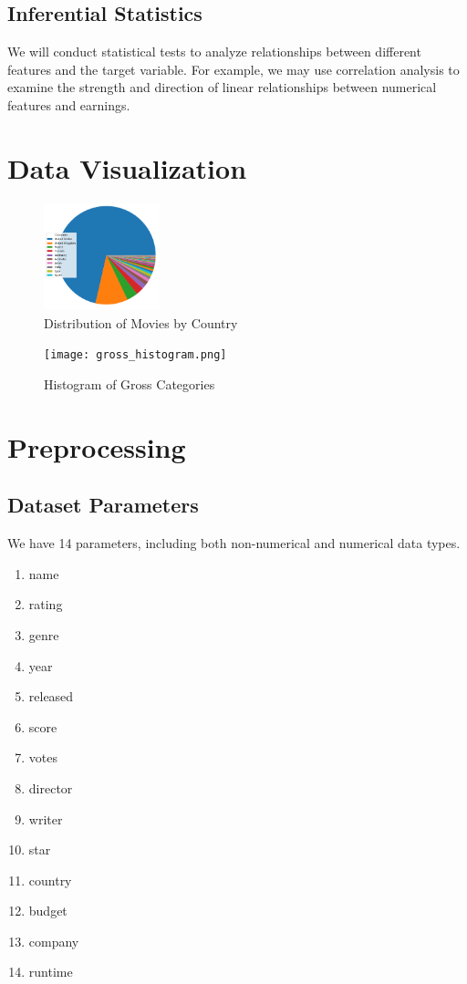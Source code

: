 \documentclass[conference]{IEEEtran}
\begin{document}
    \subsection{Inferential Statistics}
        We will conduct statistical tests to analyze relationships between different features and the target variable. For example, we may use correlation analysis to examine the strength and direction of linear relationships between numerical features and earnings.
    
    \section{Data Visualization}
    \begin{figure}[H]
        \centering
        \includegraphics[width=0.3\textwidth]{pie_chart.png}
        \caption{Distribution of Movies by Country}
        \label{fig:country-pie-chart}
    \end{figure}
    
    \begin{figure}[H]
        \centering
        \texttt{[image: gross\_histogram.png]}
        \caption{Histogram of Gross Categories}
        \label{fig:gross-histogram}
    \end{figure}

\section{Preprocessing}
    \subsection{Dataset Parameters}
        We have 14 parameters, including both non-numerical and numerical data types.
        
        \begin{enumerate}
            \item name
            \item rating
            \item genre
            \item year
            \item released
            \item score
            \item votes
            \item director
            \item writer
            \item star
            \item country
            \item budget
            \item company
            \item runtime
        \end{enumerate}
        
\end{document}

